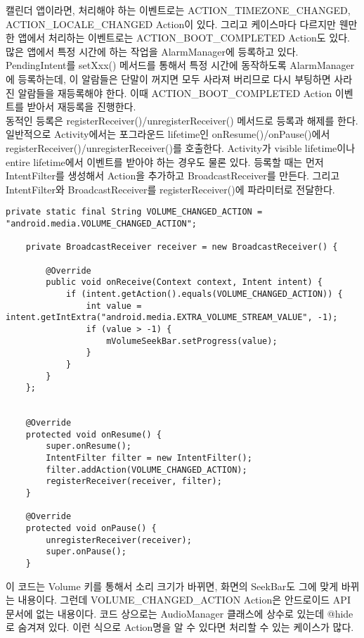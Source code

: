 캘린더 앱이라면, 처리해야 하는 이벤트로는 ACTION\_TIMEZONE\_CHANGED,
ACTION\_LOCALE\_CHANG\-ED Action이 있다.
그리고 케이스마다 다르지만 웬만한 앱에서 처리하는 이벤트로는 ACTION\_BOOT\_COMPLETED Action도 있다. 
많은 앱에서 특정 시간에 하는 작업을 AlarmManager에 등록하고 있다.
PendingIntent를 setXxx() 메서드를 통해서 특정 시간에 동작하도록 AlarmManager에 등록하는데, 이 알람들은 단말이 꺼지면 모두 사라져 버리므로 다시 부팅하면 사라진 알람들을 재등록해야 한다. 이때 ACTION\_BOOT\_COMPLETED Action 이벤트를 받아서 재등록을 진행한다.\\

동적인 등록은 registerReceiver()/unregisterReceiver() 메서드로 등록과 해제를 한다.
일반적으로 Activity에서는 포그라운드 lifetime인 onResume()/onPause()에서 registerReceiver()/unregisterReceiver()를 호출한다.
Activity가 visible lifetime이나 entire lifetime에서 이벤트를 받아야 하는 경우도 물론 있다.
등록할 때는 먼저 IntentFilter를 생성해서 Action을 추가하고 BroadcastReceiver를 만든다. 그리고 IntentFilter와 BroadcastReceiver를 registerReceiver()에 파라미터로 전달한다.
\begin{lstlisting}[frame=single] 
	private static final String VOLUME_CHANGED_ACTION = "android.media.VOLUME_CHANGED_ACTION";

	private BroadcastReceiver receiver = new BroadcastReceiver() {
		
		@Override
		public void onReceive(Context context, Intent intent) {
			if (intent.getAction().equals(VOLUME_CHANGED_ACTION)) {
				int value = intent.getIntExtra("android.media.EXTRA_VOLUME_STREAM_VALUE", -1);
				if (value > -1) {
					mVolumeSeekBar.setProgress(value);
				}
			}
		}
	};
	

	@Override
	protected void onResume() {
		super.onResume();
		IntentFilter filter = new IntentFilter();
		filter.addAction(VOLUME_CHANGED_ACTION);
		registerReceiver(receiver, filter);
	}
	
	@Override
	protected void onPause() {
		unregisterReceiver(receiver);
		super.onPause();
	}	
\end{lstlisting}

이 코드는 Volume 키를 통해서 소리 크기가 바뀌면, 화면의 SeekBar도 그에 맞게 바뀌는 내용이다. 
그런데 VOLUME\_CHANGED\_ACTION Action은 안드로이드 API 문서에 없는 내용이다.
코드 상으로는 AudioManager 클래스에 상수로 있는데 @hide로 숨겨져 있다. 
이런 식으로 Action명을 알 수 있다면 처리할 수 있는 케이스가 많다.\\

